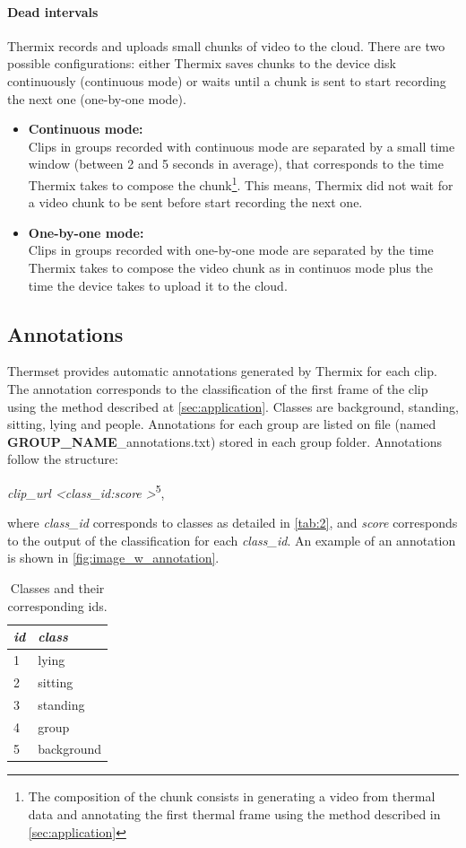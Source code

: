 \documentclass[oneside, twocolumn]{article}
\begin{document}
\paragraph{Dead intervals}
\label{par:time-gap}
Thermix records and uploads small chunks of video to the cloud. There are two possible configurations: either
Thermix saves chunks to the device disk continuously (continuous mode) or waits until a chunk is sent to start
recording the next one (one-by-one mode).
\begin{itemize}
	\item \textbf{Continuous mode:}\\
		Clips in groups recorded with continuous mode are separated by a small time window (between 2 and 5 seconds in average),
    that corresponds to the time Thermix takes to compose the chunk\footnote{The composition of the chunk consists
    in generating a video from thermal data and annotating the first thermal frame using the method described
    in \autoref{sec:application}}. This means, Thermix did not wait for a video chunk to be sent before start
    recording the next one.\\
	\item \textbf{One-by-one mode:}\\
		Clips in groups recorded with one-by-one mode are separated by the time Thermix takes to compose the video
    chunk as in continuos mode plus the time the device takes to upload it to the cloud.
\end{itemize}

\subsection{Annotations}
\label{subsec:annotations}
Thermset provides automatic annotations generated by Thermix for each clip. The annotation corresponds to the
classification of the first frame of the clip using the method described at \autoref{sec:application}.
Classes are background, standing, sitting, lying and people. Annotations for each group are listed on file
(named \textbf{GROUP\_NAME}\_annotations.txt) stored in each group folder. Annotations follow the structure:

	\textit{clip\_url \textbraceleft \textless class\_id:score \textgreater}\textbraceright \textsuperscript{5},

	where \textit{class\_id} corresponds to classes as detailed in \autoref{tab:2}, and \textit{score} corresponds to
  the output of the classification for each \textit{class\_id}.
  An example of an annotation is shown in \autoref{fig:image_w_annotation}.
\begin{table}
\center
	\begin{tabular}{l | l}
\textit{id} & \textit{class} \\
\hline
1 & lying \\
2 & sitting \\
3 & standing \\
4 & group \\
5 & background \\
\end{tabular}
  \caption{Classes and their corresponding ids.}
  \label{tab:2}
\end{table}
\end{document}
